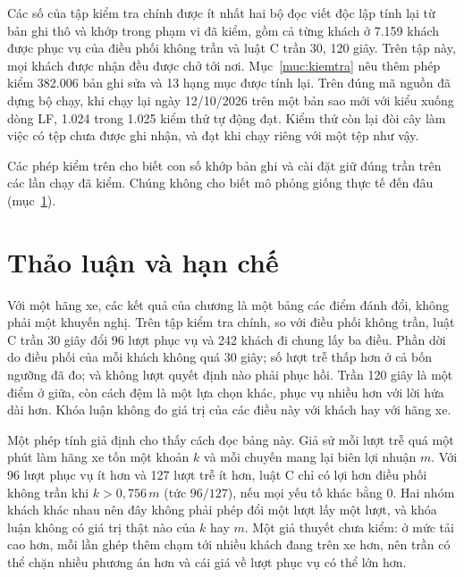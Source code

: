 Các số của tập kiểm tra chính được ít nhất hai bộ đọc viết độc lập tính lại từ bản ghi thô và khớp trong phạm vi đã
kiểm, gồm cả từng khách ở 7.159 khách được phục vụ của điều phối không trần và luật C trần 30, 120 giây. Trên tập
này, mọi khách được nhận đều được chở tới nơi. Mục~\ref{muc:kiemtra} nêu thêm phép kiểm 382.006 bản ghi sửa và 13
hạng mục được tính lại. Trên đúng mã nguồn đã dựng bộ chạy, khi chạy lại ngày 12/10/2026 trên một bản sao mới với
kiểu xuống dòng LF, 1.024 trong 1.025 kiểm thử tự động đạt. Kiểm thử còn lại đòi cây làm việc có tệp chưa được ghi
nhận, và đạt khi chạy riêng với một tệp như vậy.

Các phép kiểm trên cho biết con số khớp bản ghi và cài đặt giữ đúng trần trên các lần chạy đã kiểm. Chúng không cho
biết mô phỏng giống thực tế đến đâu (mục~\ref{muc:c4-thaoluan}).

\section{Thảo luận và hạn chế}
\label{muc:c4-thaoluan}

Với một hãng xe, các kết quả của chương là một bảng các điểm đánh đổi, không phải một khuyến nghị. Trên tập kiểm tra
chính, so với điều phối không trần, luật C trần 30 giây đổi 96 lượt phục vụ và 242 khách đi chung lấy ba điều. Phần
dời do điều phối của mỗi khách không quá 30 giây; số lượt trễ thấp hơn ở cả bốn ngưỡng đã đo; và không lượt quyết
định nào phải phục hồi. Trần 120 giây là một điểm ở giữa, còn cách đệm là một lựa chọn khác, phục vụ nhiều hơn với
lời hứa dài hơn. Khóa luận không đo giá trị của các điều này với khách hay với hãng xe.

Một phép tính giả định cho thấy cách đọc bảng này. Giả sử mỗi lượt trễ quá một phút làm hãng xe tốn một khoản $k$
và mỗi chuyến mang lại biên lợi nhuận $m$. Với 96 lượt phục vụ ít hơn và 127 lượt trễ ít hơn, luật C chỉ có lợi hơn
điều phối không trần khi $k > 0{,}756\,m$ (tức $96/127$), nếu mọi yếu tố khác bằng 0. Hai nhóm khách khác nhau nên
đây không phải phép đổi một lượt lấy một lượt, và khóa luận không có giá trị thật nào của $k$ hay $m$. Một giả thuyết
chưa kiểm: ở mức tải cao hơn, mỗi lần ghép thêm chạm tới nhiều khách đang trên xe hơn, nên trần có thể chặn nhiều
phương án hơn và cái giá về lượt phục vụ có thể lớn hơn.

